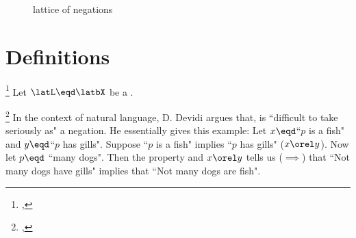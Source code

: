 \begin{figure}
  \begin{center}
    \gsize
  \end{center}
  \caption{lattice of negations\label{fig:latnegations}}
\end{figure}

\section{Definitions}
\begin{definition}
\footnote{
  ,
  }
\label{def:negsub}
Let $\latL\eqd\latbX$ be a  .
\end{definition}

\begin{remark}
\footnote{
  ,
  }
\label{rem:negsub}
In the context of natural language, D. Devidi argues that,   
is ``difficult to take seriously as" a negation.
He essentially gives this example:
Let $x\eqd$``$p$ is a fish" and $y\eqd$``$p$ has gills".
Suppose ``$p$ is a fish" implies ``$p$ has gills" ($x\orel y$).
Now let $p\eqd$ ``many dogs".
Then the  property and $x\orel y$ tells us ($\implies$) that
``Not many dogs have gills" implies that ``Not many dogs are fish".
\end{remark}


